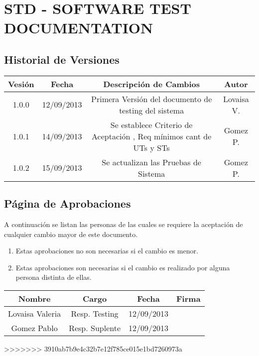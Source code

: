 \chapter{\textcolor[gray]{.8}{STD - SOFTWARE TEST DOCUMENTATION}}
\newpage
\section{\textcolor[gray]{.2}{Historial de Versiones}}
\begin{table}[!h]
\begin{center}
\begin{tabular}{|c|c|c|c|}
\hline
\rowcolor[gray]{.8} Vesión & Fecha & Descripción de Cambios & Autor\\
\hline
1.0.0 & 12/09/2013 & Primera Versión del documento de testing del sistema & Lovaisa V.\\
\hline
1.0.1 & 14/09/2013 & Se establece Criterio de Aceptación , Req mínimos cant de UTs y STs & Gomez P.\\
\hline
1.0.2 & 15/09/2013 & Se actualizan las Pruebas de Sistema & Gomez P.\\
\hline
\end{tabular}
\end{center}
\end{table}
\newpage

\section{\textcolor[gray]{.2}{Página de Aprobaciones}}
A continuación se listan las personas de las cuales se requiere la aceptación de cualquier cambio mayor de este documento.
\begin{enumerate}
  \item Estas aprobaciones no son necesarias si el cambio es menor.
  \item Estas aprobaciones son necesarias si el cambio es realizado por alguna
  persona distinta de ellas.
\end{enumerate}
\begin{table}[!h]
\begin{center}
\begin{tabular}{|c|c|c|c|}
\hline
\rowcolor[gray]{.8} Nombre & Cargo & Fecha & Firma\\
\hline
Lovaisa Valeria & Resp. Testing & 12/09/2013 & \\
\hline
Gomez Pablo & Resp. Suplente & 12/09/2013 & \\
\hline
\end{tabular}
\end{center}
\end{table}
>>>>>>> 3910ab7b9e4c32b7e12f785ce015e1bd7260973a

